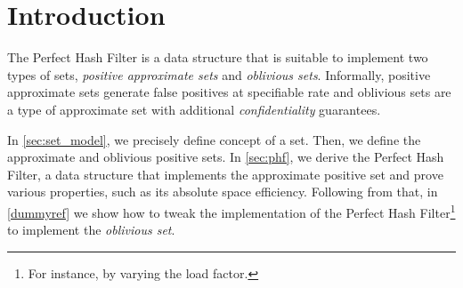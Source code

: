\documentclass[ ../main.tex]{subfiles}
\begin{document}
\section{Introduction}
The Perfect Hash Filter is a data structure that is suitable to implement two types of sets, \emph{positive approximate sets}\cite{aset} and \emph{oblivious sets}\cite{obset}. Informally, positive approximate sets generate false positives at specifiable rate and oblivious sets are a type of approximate set with additional \emph{confidentiality} guarantees.

In \cref{sec:set_model}, we precisely define concept of a set. Then, we define the approximate and oblivious positive sets. In \cref{sec:phf}, we derive the Perfect Hash Filter, a data structure that implements the approximate positive set and prove various properties, such as its absolute space efficiency. Following from that, in \cref{dummyref} we show how to tweak the implementation of the Perfect Hash Filter\footnote{For instance, by varying the load factor.} to implement the \emph{oblivious set}. 
\end{document}
